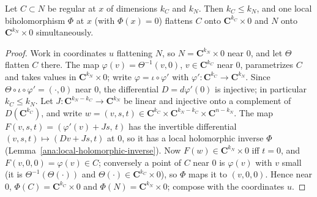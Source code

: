 \begin{lemma}
\label{bcalc:nested-flattening}
\leanok
Let \(C\subset N\) be regular at \(x\) of dimensions \(k_C\) and \(k_N\). Then \(k_C\le k_N\), and one local biholomorphism
\(\Phi\) at \(x\) (with \(\Phi(x)=0\)) flattens \(C\) onto \(\mathbf C^{k_C}\times0\) and \(N\) onto \(\mathbf C^{k_N}\times0\) simultaneously.
\end{lemma}
\begin{proof}
\leanok
Work in coordinates \(u\) flattening \(N\), so \(N=\mathbf C^{k_N}\times0\) near \(0\), and let \(\Theta\) flatten \(C\) there. The map
\(\varphi(v)=\Theta^{-1}(v,0)\), \(v\in\mathbf C^{k_C}\) near \(0\), parametrizes \(C\) and takes values in \(\mathbf C^{k_N}\times0\); write
\(\varphi=\iota\circ\varphi'\) with \(\varphi'\colon\mathbf C^{k_C}\to\mathbf C^{k_N}\). Since \(\Theta\circ\iota\circ\varphi'=(\cdot,0)\) near
\(0\), the differential \(D=d\varphi'(0)\) is injective; in particular \(k_C\le k_N\). Let \(J\colon\mathbf C^{k_N-k_C}\to\mathbf C^{k_N}\) be
linear and injective onto a complement of \(D(\mathbf C^{k_C})\), and write \(w=(v,s,t)\in\mathbf C^{k_C}\times\mathbf C^{k_N-k_C}\times
\mathbf C^{n-k_N}\). The map \(F(v,s,t)=(\varphi'(v)+Js,\,t)\) has the invertible differential \((v,s,t)\mapsto(Dv+Js,t)\) at \(0\), so it
has a local holomorphic inverse \(\Phi\) (Lemma~\ref{ana:local-holomorphic-inverse}). Now \(F(w)\in\mathbf C^{k_N}\times0\) iff \(t=0\),
and \(F(v,0,0)=\varphi(v)\in C\); conversely a point of \(C\) near \(0\) is \(\varphi(v)\) with \(v\) small (it is
\(\Theta^{-1}(\Theta(\cdot))\) and \(\Theta(\cdot)\in\mathbf C^{k_C}\times0\)), so \(\Phi\) maps it to \((v,0,0)\). Hence near \(0\),
\(\Phi(C)=\mathbf C^{k_C}\times0\) and \(\Phi(N)=\mathbf C^{k_N}\times0\); compose with the coordinates \(u\).
\end{proof}

